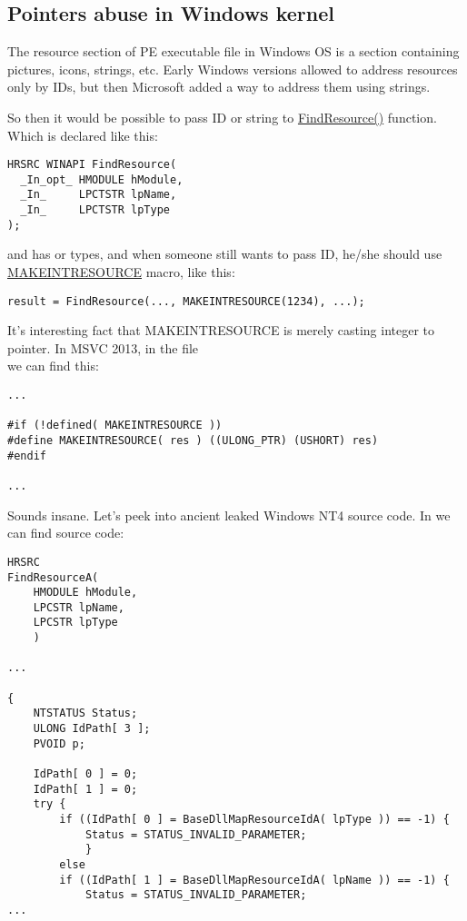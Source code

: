\subsection{Pointers abuse in Windows kernel}

The resource section of PE executable file in Windows OS is a section containing pictures, icons, strings, etc.
Early Windows versions allowed to address resources only by IDs, but then Microsoft added a way to address them using strings.

So then it would be possible to pass ID or string to 
\href{https://msdn.microsoft.com/en-us/library/windows/desktop/ms648042%28v=vs.85%29.aspx}{FindResource()} function.
Which is declared like this:


\begin{lstlisting}
HRSRC WINAPI FindResource(
  _In_opt_ HMODULE hModule,
  _In_     LPCTSTR lpName,
  _In_     LPCTSTR lpType
);
\end{lstlisting}

 and  has  or  types, and when someone still wants to pass ID, he/she should use
\href{https://msdn.microsoft.com/en-us/library/windows/desktop/ms648029%28v=vs.85%29.aspx}{MAKEINTRESOURCE} macro, like this:


\begin{lstlisting}
result = FindResource(..., MAKEINTRESOURCE(1234), ...);
\end{lstlisting}

It's interesting fact that MAKEINTRESOURCE is merely casting integer to pointer.
In MSVC 2013, in the file\\
 we can find this:

\begin{lstlisting}
...

#if (!defined( MAKEINTRESOURCE )) 
#define MAKEINTRESOURCE( res ) ((ULONG_PTR) (USHORT) res)
#endif

...
\end{lstlisting}

Sounds insane. Let's peek into ancient leaked Windows NT4 source code.
In  we can find  source code:

\begin{lstlisting}
HRSRC
FindResourceA(
    HMODULE hModule,
    LPCSTR lpName,
    LPCSTR lpType
    )

...

{
    NTSTATUS Status;
    ULONG IdPath[ 3 ];
    PVOID p;

    IdPath[ 0 ] = 0;
    IdPath[ 1 ] = 0;
    try {
        if ((IdPath[ 0 ] = BaseDllMapResourceIdA( lpType )) == -1) {
            Status = STATUS_INVALID_PARAMETER;
            }
        else
        if ((IdPath[ 1 ] = BaseDllMapResourceIdA( lpName )) == -1) {
            Status = STATUS_INVALID_PARAMETER;
...
\end{lstlisting}


